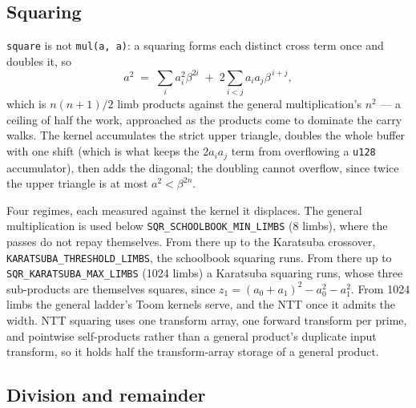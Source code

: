 \documentclass[11pt]{article}
\newcommand{\code}[1]{\texttt{#1}}
\begin{document}
\subsection{Squaring}
\label{sec:squaring}

\code{square} is not \code{mul(a, a)}: a squaring forms each
distinct cross term once and doubles it, so
\begin{equation}
a^2 \;=\; \sum_i a_i^2 \beta^{2i}
        \;+\; 2 \sum_{i<j} a_i a_j \beta^{\,i+j},
\end{equation}
which is $n(n+1)/2$ limb products against the general multiplication's
$n^2$ --- a ceiling of half the work, approached as the products come to
dominate the carry walks. The kernel accumulates the strict upper triangle,
doubles the whole buffer with one shift (which is what keeps the
$2a_ia_j$ term from overflowing a \code{u128} accumulator), then adds the
diagonal; the doubling cannot overflow, since twice the upper triangle is
at most $a^2 < \beta^{2n}$.

Four regimes, each measured against the kernel it displaces. The general
multiplication is used below \code{SQR\_SCHOOLBOOK\_MIN\_LIMBS} (8 limbs),
where the passes do not repay themselves. From there up to the
Karatsuba crossover, \code{KARATSUBA\_THRESHOLD\_LIMBS}, the schoolbook
squaring runs. From there up to \code{SQR\_KARATSUBA\_MAX\_LIMBS} (1024
limbs) a Karatsuba squaring runs, whose three sub-products are themselves
squares, since $z_1 = (a_0+a_1)^2 - a_0^2 - a_1^2$. From 1024 limbs the
general ladder's Toom kernels serve, and the NTT once it admits the width.
NTT squaring uses one
transform array, one forward transform per prime, and pointwise
self-products rather than a general product's duplicate input transform, so
it holds half the transform-array storage of a general product.

\subsection{Division and remainder}
\end{document}
